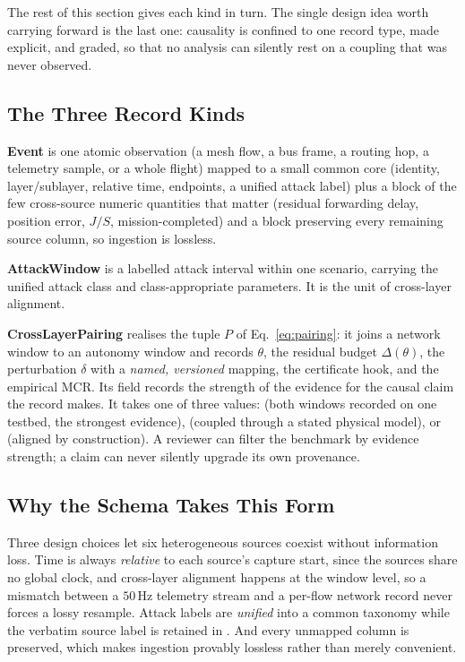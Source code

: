 The rest of this section gives each kind in turn. The single design idea worth
carrying forward is the last one: causality is confined to one record type, made
explicit, and graded, so that no analysis can silently rest on a coupling that
was never observed.

\subsection{The Three Record Kinds}
\textbf{Event} is one atomic observation (a mesh flow, a bus frame, a routing
hop, a telemetry sample, or a whole flight) mapped to a small common core
(identity, layer/sublayer, relative time, endpoints, a unified attack label)
plus a  block of the few cross-source numeric quantities that
matter (residual forwarding delay, position error, $J/S$, mission-completed) and
a  block preserving every remaining source column, so ingestion is
lossless.

\textbf{AttackWindow} is a labelled attack interval within one scenario,
carrying the unified attack class and class-appropriate 
parameters. It is the unit of cross-layer alignment.

\textbf{CrossLayerPairing} realises the tuple $P$ of Eq.~\eqref{eq:pairing}: it
joins a network window to an autonomy window and records $\theta$, the residual
budget $\Delta(\theta)$, the perturbation $\delta$ with a \emph{named,
versioned} mapping, the certificate hook, and the empirical MCR. Its
 field records the strength of the evidence for the
causal claim the record makes. It takes one of three values:
 (both windows recorded on one testbed, the
strongest evidence),  (coupled through a stated physical
model), or  (aligned by construction). A reviewer can
filter the benchmark by evidence strength; a claim can never silently upgrade
its own provenance.

\subsection{Why the Schema Takes This Form}
Three design choices let six heterogeneous sources coexist without information
loss. Time is always \emph{relative} to each source's capture start, since the
sources share no global clock, and cross-layer alignment happens at the window
level, so a mismatch between a $50$\,Hz telemetry stream and a per-flow network
record never forces a lossy resample. Attack labels are \emph{unified} into a
common taxonomy while the verbatim source label is retained in
. And every unmapped column is preserved, which makes
ingestion provably lossless rather than merely convenient.

